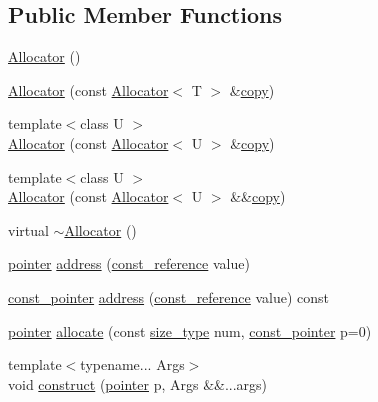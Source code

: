 \subsection*{Public Member Functions}
\begin{DoxyCompactItemize}
\item 
\hyperlink{classprism_1_1_allocator_a23e9458b3637d24fcb4d0a4feadac646}{Allocator} ()
\item 
\hyperlink{classprism_1_1_allocator_a974f6bcc97b9ad8cd3cba142f5c51ccf}{Allocator} (const \hyperlink{classprism_1_1_allocator}{Allocator}$<$ T $>$ \&\hyperlink{namespaceprism_ae776f4cd825f79e7af1cf6ee1d90a209}{copy})
\item 
{\footnotesize template$<$class U $>$ }\\\hyperlink{classprism_1_1_allocator_a87ddac6131f7b88ae2ff9bad3997a154}{Allocator} (const \hyperlink{classprism_1_1_allocator}{Allocator}$<$ U $>$ \&\hyperlink{namespaceprism_ae776f4cd825f79e7af1cf6ee1d90a209}{copy})
\item 
{\footnotesize template$<$class U $>$ }\\\hyperlink{classprism_1_1_allocator_a4863b97f388493584befc0131857ebb1}{Allocator} (const \hyperlink{classprism_1_1_allocator}{Allocator}$<$ U $>$ \&\&\hyperlink{namespaceprism_ae776f4cd825f79e7af1cf6ee1d90a209}{copy})
\item 
virtual \hyperlink{classprism_1_1_allocator_a3c220f4ea1fdb82ba53817cac0132c20}{$\sim$\+Allocator} ()
\item 
\hyperlink{classprism_1_1_allocator_ad3c6706a7243bd3ef489e16d34d5750f}{pointer} \hyperlink{classprism_1_1_allocator_afb90329306f4d3c8a29b3e715caa580c}{address} (\hyperlink{classprism_1_1_allocator_a89911899c97ae877a81b798957a2d899}{const\+\_\+reference} value)
\item 
\hyperlink{classprism_1_1_allocator_af6a4a91dfc203203ecc319a457ce4dce}{const\+\_\+pointer} \hyperlink{classprism_1_1_allocator_a2607cb18ace08eb0a509ec6bb5da74f0}{address} (\hyperlink{classprism_1_1_allocator_a89911899c97ae877a81b798957a2d899}{const\+\_\+reference} value) const 
\item 
\hyperlink{classprism_1_1_allocator_ad3c6706a7243bd3ef489e16d34d5750f}{pointer} \hyperlink{classprism_1_1_allocator_abd2088109382320f4233023d1fa8b39d}{allocate} (const \hyperlink{classprism_1_1_allocator_a47cb9435e4e9ff4c934ea3d4b4338d52}{size\+\_\+type} num, \hyperlink{classprism_1_1_allocator_af6a4a91dfc203203ecc319a457ce4dce}{const\+\_\+pointer} p=0)
\item 
{\footnotesize template$<$typename... Args$>$ }\\void \hyperlink{classprism_1_1_allocator_a499d6a8214f4ee6e094168ad5cf15a71}{construct} (\hyperlink{classprism_1_1_allocator_ad3c6706a7243bd3ef489e16d34d5750f}{pointer} p, Args \&\&...args)

\end{DoxyCompactItemize}
